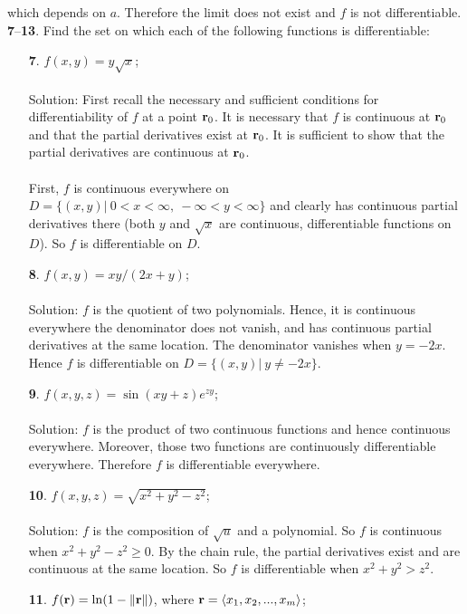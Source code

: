 \documentclass[12pt]{amsbook}
\newcommand{\la}{\langle}
\newcommand{\ra}{\rangle}
\begin{document}
which depends on $a$. Therefore the limit does not exist and $f$ is not differentiable.
\\
\noindent
{\small {\bf 7}--{\bf 13}}. Find the set on which each of the following functions is differentiable:
\begin{enumerate}
\item[{\small\bf 7}.] $f(x,y)=y\sqrt{x}$;
\\
\\
{\sc Solution}: First recall the necessary and sufficient conditions for differentiability of $f$ at a point ${\bf r}_0$. It is necessary that $f$ is continuous at ${\bf r}_0$ and that the partial derivatives exist at ${\bf r}_0$. It is sufficient to show that the partial derivatives are continuous at ${\bf r}_0$. 
\\
\\
First, $f$ is continuous everywhere on $D=\{ (x,y)| \ 0<x<\infty, \ -\infty<y<\infty\}$ and clearly has continuous partial derivatives there (both $y$ and $\sqrt{x}$ are continuous, differentiable functions on $D$). So $f$ is differentiable on $D$.
\\ 
\item[{\small\bf 8}.] $f(x,y)=xy/(2x+y)$;
\\
\\
{\sc Solution}: $f$ is the quotient of two polynomials. Hence, it is continuous everywhere the denominator does not vanish, and has continuous partial derivatives at the same location. The denominator vanishes when $y=-2x$. Hence $f$ is differentiable on $D=\{(x,y)| \ y\neq -2x \}$.
\\
\item[{\small\bf 9}.] $f(x,y,z)=\sin(xy+z)e^{zy}$;
\\
\\
{\sc Solution}: $f$ is the product of two continuous functions and hence continuous everywhere. Moreover, those two functions are continuously differentiable everywhere. Therefore $f$ is differentiable everywhere.
\\
\item[{\small\bf 10}.] $f(x,y,z)=\sqrt{x^2+y^2-z^2}$;
\\
\\
{\sc Solution}: $f$ is the composition of $\sqrt{u}$ and a polynomial. So $f$ is continuous when $x^2+y^2-z^2 \geq 0$. By the chain rule, the partial derivatives exist and are continuous at the same location. So $f$ is differentiable when $x^2+y^2>z^2$.
\\
\item[{\small\bf 11}.] $f({\bf r})=\ln(1-\|{\bf r}\|)$, where ${\bf r}=\la x_1,x_2,...,x_m \ra$;

\end{enumerate}
\end{document}
